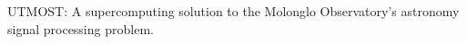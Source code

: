 UTMOST: A supercomputing solution to the Molonglo Observatory's astronomy signal processing problem.